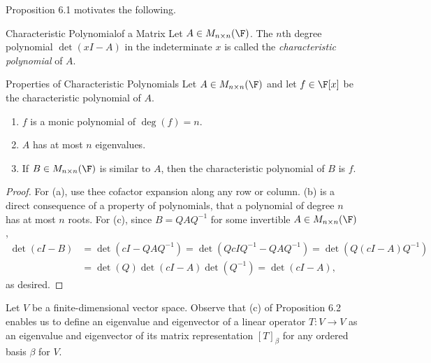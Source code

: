 \documentclass[linearalgebra]{subfiles}
\begin{document}
    \begin{remark}
        Proposition 6.1 motivates the following.
    \end{remark}

    \begin{definition}{Characteristic Polynomial}{of a Matrix}
        Let $A\in M_{n\times n}(\F)$. The $n$th degree polynomial $\det \left( xI-A \right)$ in the indeterminate $x$ is called the \emph{characteristic polynomial} of $A$.
    \end{definition}

    \begin{prop}{Properties of Characteristic Polynomials}
        Let $A\in M_{n\times n}(\F)$ and let $f\in\F[x]$ be the characteristic polynomial of $A$. 
        \begin{enumerate}
            \item $f$ is a monic polynomial of $\deg(f)=n$.
            \item $A$ has at most $n$ eigenvalues.
            \item If $B\in M_{n\times n}(\F)$ is similar to $A$, then the characteristic polynomial of $B$ is $f$.
        \end{enumerate}
    \end{prop}

    \begin{proof}
        For (a), use thee cofactor expansion along any row or column. (b) is a direct consequence of a property of polynomials, that a polynomial of degree $n$ has at most $n$ roots. For (c), since $B = QAQ^{-1}$ for some invertible $A\in M_{n\times n}(\F)$,
        \begin{align*}
            \det \left( cI-B \right) & = \det \left( cI-QAQ^{-1} \right) = \det \left( QcIQ^{-1} - QAQ^{-1} \right) = \det \left( Q \left( cI-A \right) Q^{-1} \right) \\
                                            & = \det (Q) \det (cI-A) \det \left( Q^{-1} \right) = \det (cI-A),
        \end{align*} 
        as desired.
    \end{proof}

    \begin{remark}
        Let $V$ be a finite-dimensional vector space. Observe that (c) of Proposition 6.2 enables us to define an eigenvalue and eigenvector of a linear operator $T:V\to V$ as an eigenvalue and eigenvector of its matrix representation $\left[ T \right] _\beta$ for any ordered basis $\beta$ for $V$.
    \end{remark}
\end{document}
